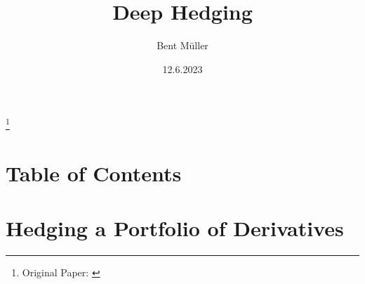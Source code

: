 \documentclass[serif]{beamer}
\title{Deep Hedging}
\author{Bent Müller}
\institute{University of Hamburg, Department of Mathematics}
\date{12.6.2023}
\begin{document}
\begin{frame}
    \titlepage
    \footnote{
        Original Paper: \cite[Deep Hedging]{bühler2018deep}
    }
\end{frame}


\section{Table of Contents}
\begin{frame}
    \tableofcontents
\end{frame}

\section{Hedging a Portfolio of Derivatives}
\end{document}
